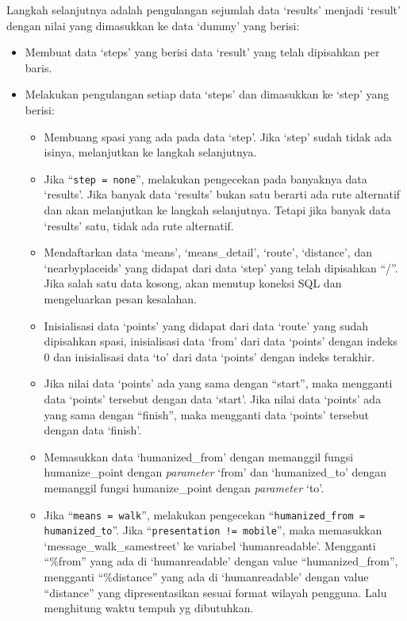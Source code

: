 Langkah selanjutnya adalah pengulangan sejumlah data `results' menjadi `result' dengan nilai yang dimasukkan ke data `dummy' yang berisi:
\begin{itemize}
	\item Membuat data `steps' yang berisi data `result' yang telah dipisahkan per baris.
	\item Melakukan pengulangan setiap data `steps' dan dimasukkan ke `step' yang berisi:
	\begin{itemize}
		\item Membuang spasi yang ada pada data `step'. Jika `step' sudah tidak ada isinya, melanjutkan ke langkah selanjutnya.
		\item Jika ``\texttt{step = none}'', melakukan pengecekan pada banyaknya data `results'. Jika banyak data `results' bukan satu berarti ada rute alternatif dan akan melanjutkan ke langkah selanjutnya. Tetapi jika banyak data `results' satu, tidak ada rute alternatif.
		\item Mendaftarkan data `means', `means\_detail', `route', `distance', dan `nearbyplaceids' yang didapat dari data `step' yang telah dipisahkan ``/''. Jika salah satu data kosong, akan menutup koneksi SQL dan mengeluarkan pesan kesalahan.
		\item Inisialisasi data `points' yang didapat dari data `route' yang sudah dipisahkan spasi, inisialisasi data `from' dari data `points' dengan indeks 0 dan inisialisasi data `to' dari data `points' dengan indeks terakhir.
		\item Jika nilai data `points' ada yang sama dengan ``start'', maka mengganti data `points' tersebut dengan data `start'. Jika nilai data `points' ada yang sama dengan ``finish'', maka mengganti data `points' tersebut dengan data `finish'.
		 \item Memasukkan data `humanized\_from' dengan memanggil fungsi humanize\_point dengan \textit{parameter} `from' dan `humanized\_to' dengan memanggil fungsi humanize\_point dengan \textit{parameter} `to'.
		 \item Jika ``\texttt{means = walk}'', melakukan pengecekan ``\texttt{humanized\_from = humanized\_to}''. Jika ``\texttt{presentation != mobile}'', maka memasukkan `message\_walk\_samestreet' ke variabel `humanreadable'. Mengganti ``\%from'' yang ada di `humanreadable' dengan value ``humanized\_from'', mengganti ``\%distance'' yang ada di `humanreadable' dengan value ``distance'' yang dipresentasikan sesuai format wilayah pengguna. Lalu menghitung waktu tempuh yg dibutuhkan.

\end{itemize}
\end{itemize}
